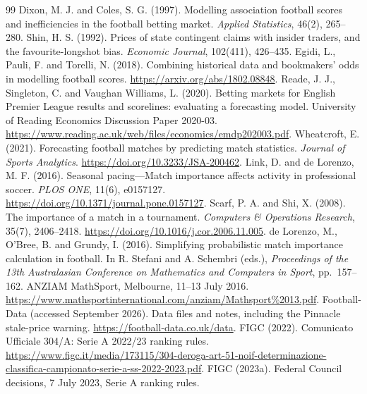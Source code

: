 \documentclass[11pt]{article}
\begin{document}
\begin{thebibliography}{99}
Dixon, M. J. and Coles, S. G. (1997).
Modelling association football scores and inefficiencies in the football
betting market. \emph{Applied Statistics}, 46(2), 265--280.
Shin, H. S. (1992). Prices of state contingent claims with insider traders,
and the favourite-longshot bias. \emph{Economic Journal}, 102(411), 426--435.
Egidi, L., Pauli, F. and Torelli, N. (2018).
Combining historical data and bookmakers' odds in modelling football scores.
\url{https://arxiv.org/abs/1802.08848}.
Reade, J. J., Singleton, C. and Vaughan Williams, L. (2020).
Betting markets for English Premier League results and scorelines:
evaluating a forecasting model.
University of Reading Economics Discussion Paper 2020-03.
\url{https://www.reading.ac.uk/web/files/economics/emdp202003.pdf}.
Wheatcroft, E. (2021). Forecasting football matches by predicting match
statistics. \emph{Journal of Sports Analytics}.
\url{https://doi.org/10.3233/JSA-200462}.
Link, D. and de Lorenzo, M. F. (2016).
Seasonal pacing---Match importance affects activity in professional soccer.
\emph{PLOS ONE}, 11(6), e0157127.
\url{https://doi.org/10.1371/journal.pone.0157127}.
Scarf, P. A. and Shi, X. (2008).
The importance of a match in a tournament.
\emph{Computers \& Operations Research}, 35(7), 2406--2418.
\url{https://doi.org/10.1016/j.cor.2006.11.005}.
de Lorenzo, M., O'Bree, B. and Grundy, I. (2016).
Simplifying probabilistic match importance calculation in football.
In R. Stefani and A. Schembri (eds.), \emph{Proceedings of the 13th Australasian
Conference on Mathematics and Computers in Sport}, pp.~157--162.
ANZIAM MathSport, Melbourne, 11--13 July 2016.
\url{https://www.mathsportinternational.com/anziam/Mathsport%2013.pdf}.
Football-Data (accessed September 2026).
Data files and notes, including the Pinnacle stale-price warning.
\url{https://football-data.co.uk/data}.
FIGC (2022). Comunicato Ufficiale 304/A: Serie A 2022/23 ranking rules.
\url{https://www.figc.it/media/173115/304-deroga-art-51-noif-determinazione-classifica-campionato-serie-a-ss-2022-2023.pdf}.
FIGC (2023a). Federal Council decisions, 7 July 2023, Serie A ranking rules.

\end{thebibliography}
\end{document}
